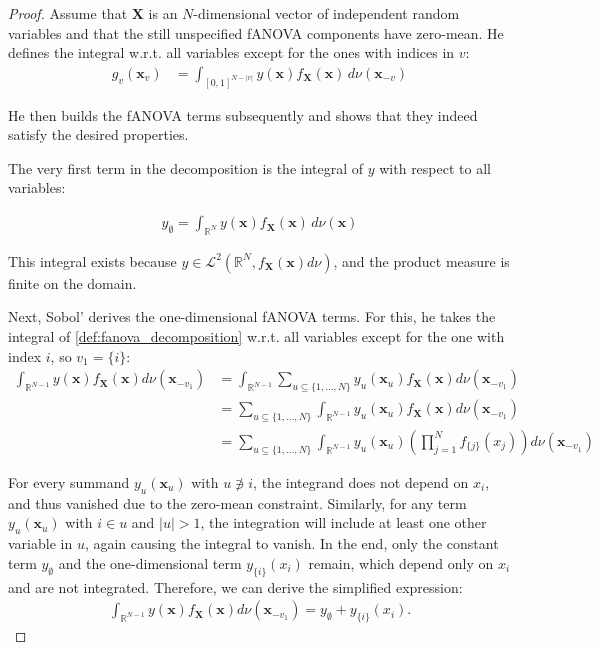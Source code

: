 \begin{proof}
    Assume that $\boldsymbol{X}$ is an $N$-dimensional vector of independent random variables and
    that the still unspecified fANOVA components have zero-mean. He defines the integral w.r.t. all variables except for the ones with indices in \( v \):
    \begin{align*}
        g_v(\boldsymbol{x}_v) &= \int_{[0, 1]^{N - |v|}} y(\boldsymbol{x}) f_{\boldsymbol{X}}(\boldsymbol{x}) \, d\nu (\boldsymbol{x}_{-v})
    \end{align*}

He then builds the fANOVA terms subsequently and shows that they indeed satisfy the desired properties.\par
The very first term in the decomposition is the integral of \( y \) with respect to all variables:

\begin{align*}
    y_{\emptyset} = \int_{\mathbb{R}^N} y(\boldsymbol{x}) f_{\boldsymbol{X}}(\boldsymbol{x}) \, d\nu(\boldsymbol{x})
\end{align*}

This integral exists because \( y \in \mathcal{L}^2(\mathbb{R}^N, f_{\boldsymbol{X}}(\boldsymbol{x}) d\nu) \), and the product measure is finite on the domain.

Next, Sobol' derives the one-dimensional fANOVA terms. For this, he takes the integral of \autoref{def:fanova_decomposition} w.r.t. all variables except for the one with index \( i \), so $v_1 = \{i\}$:
\begin{align*}
    \int_{\mathbb{R}^{N-1}} y(\boldsymbol{x}) f_{\boldsymbol{X}}(\boldsymbol{x}) d\nu (\boldsymbol{x}_{-v_1}) 
    &= \int_{\mathbb{R}^{N-1}} \sum_{u \subseteq \{1, \dots, N\}} y_{u}(\boldsymbol{x}_u) f_{\boldsymbol{X}}(\boldsymbol{x}) d\nu (\boldsymbol{x}_{-v_1}) \\
    &= \sum_{u \subseteq \{1, \dots, N\}} \int_{\mathbb{R}^{N-1}} y_{u}(\boldsymbol{x}_u) f_{\boldsymbol{X}}(\boldsymbol{x}) d\nu (\boldsymbol{x}_{-v_1}) \\
    &= \sum_{u \subseteq \{1, \dots, N\}} \int_{\mathbb{R}^{N-1}} y_{u}(\boldsymbol{x}_u) \left( \prod_{j=1}^N f_{{\{j\}}}(x_j) \right) d\nu (\boldsymbol{x}_{-v_1})
\end{align*}

For every summand \( y_u(\boldsymbol{x}_u) \) with \( u \not\ni i \), the integrand does not depend on \( x_i \), and thus vanished due to the zero-mean constraint.
Similarly, for any term \( y_u(\boldsymbol{x}_u) \) with \( i \in u \) and \( |u| > 1 \), the integration will include at least one other variable in \( u \), again causing the integral to vanish.
In the end, only the constant term \( y_{\emptyset} \) and the one-dimensional term \( y_{\{i\}}(x_i) \) remain, which depend only on \( x_i \) and are not integrated.
Therefore, we can derive the simplified expression:
\begin{align*}
    \int_{\mathbb{R}^{N-1}} y(\boldsymbol{x}) f_{\boldsymbol{X}}(\boldsymbol{x}) d\nu (\boldsymbol{x}_{-v_1}) = y_{\emptyset} + y_{\{i\}}(x_i).
\end{align*}


\end{proof}
